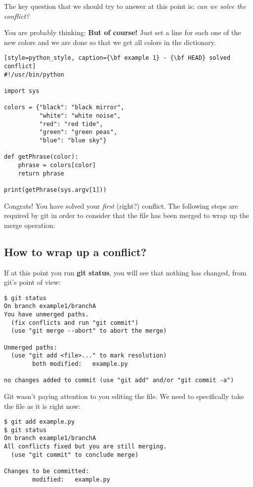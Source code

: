 The key question that we should try to answer at this point is: {\it can we solve the conflict?}

You are probably thinking: {\bf But of course!} Just set a line for each one of the new colors and we are done so that
we get all colors in the dictionary.

\begin{lstlisting}[style=python_style, caption={\bf example 1} - {\bf HEAD} solved conflict]
#!/usr/bin/python

import sys

colors = {"black": "black mirror",
          "white": "white noise",
          "red": "red tide",
          "green": "green peas",
          "blue": "blue sky"}

def getPhrase(color):
    phrase = colors[color]
    return phrase

print(getPhrase(sys.argv[1]))
\end{lstlisting}

Congrats! You have solved your {\it first} (right?) conflict. The following steps are required by git in order
to consider that the file has been merged to wrap up the merge operation:

\subsection{How to wrap up a conflict?}

If at this point you run {\bf git status}, you will see that nothing has changed, from git's point of view:

\begin{lstlisting}[style=console_style, caption={\bf git status} after solving the conflict]
$ git status
On branch example1/branchA
You have unmerged paths.
  (fix conflicts and run "git commit")
  (use "git merge --abort" to abort the merge)

Unmerged paths:
  (use "git add <file>..." to mark resolution)
        both modified:   example.py

no changes added to commit (use "git add" and/or "git commit -a")
\end{lstlisting}

Git wasn't paying attention to you editing the file. We need to specifically take the file as it is right now:

\begin{lstlisting}[style=console_style, caption={\bf git add; git status}]
$ git add example.py 
$ git status
On branch example1/branchA
All conflicts fixed but you are still merging.
  (use "git commit" to conclude merge)

Changes to be committed:
        modified:   example.py
\end{lstlisting}

